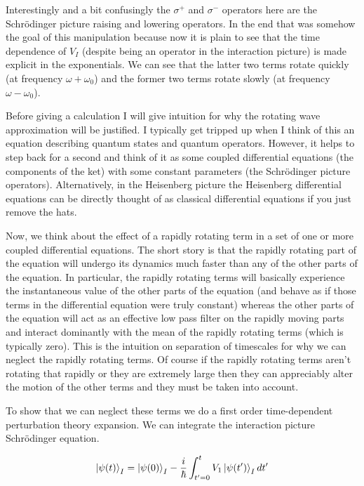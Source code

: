 \documentclass[12pt]{article}
\begin{document}
Interestingly and a bit confusingly the $\sigma^+$ and $\sigma^-$ operators here are the Schr{\"o}dinger picture raising and lowering operators. In the end that was somehow the goal of this manipulation because now it is plain to see that the time dependence of $V_I$ (despite being an operator in the interaction picture) is made explicit in the exponentials. We can see that the latter two terms rotate quickly (at frequency $\omega+\omega_0$) and the former two terms rotate slowly (at frequency $\omega - \omega_0$).

Before giving a calculation I will give intuition for why the rotating wave approximation will be justified. I typically get tripped up when I think of this an equation describing quantum states and quantum operators. However, it helps to step back for a second and think of it as some coupled differential equations (the components of the ket) with some constant parameters (the Schr{\"o}dinger picture operators). Alternatively, in the Heisenberg picture the Heisenberg differential equations can be directly thought of as classical differential equations if you just remove the hats. 

Now, we think about the effect of a rapidly rotating term in a set of one or more coupled differential equations. The short story is that the rapidly rotating part of the equation will undergo its dynamics much faster than any of the other parts of the equation. In particular, the rapidly rotating terms will basically experience the instantaneous value of the other parts of the equation (and behave as if those terms in the differential equation were truly constant) whereas the other parts of the equation will act as an effective low pass filter on the rapidly moving parts and interact dominantly with the mean of the rapidly rotating terms (which is typically zero). This is the intuition on separation of timescales for why we can neglect the rapidly rotating terms. Of course if the rapidly rotating terms aren't rotating that rapidly or they are extremely large then they can appreciably alter the motion of the other terms and they must be taken into account.

To show that we can neglect these terms we do a first order time-dependent perturbation theory expansion. We can integrate the interaction picture Schr{\"o}dinger equation.

\begin{align}
\ket{\psi(t)}_I = \ket{\psi(0)}_I -\frac{i}{\hbar}\int_{t'=0}^{t} V_1 \ket{\psi(t')}_Idt'
\end{align}
\end{document}
